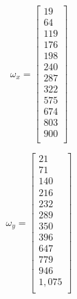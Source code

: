\documentclass[11pt,a4paper,titlepage]{report}
\begin{document}
\begin{minipage}{0.45\linewidth}
\begin{small}
\begin{equation}
    \omega_x=
    \left[
    \begin{matrix}
    19\\
    64\\
    119\\
    176\\
    198\\
    240\\
    287\\
    322\\
    575\\
    674\\
    803\\
    900\\
    \end{matrix}
    \right]
    \label{eq:I.1 - omega x}
\end{equation}
\end{small}
\end{minipage}
\begin{minipage}{0.45\linewidth}
\begin{small}
\begin{equation}
    \omega_y=
    \left[
    \begin{matrix}
    21\\
    71\\
    140\\
    216\\
    232\\
    289\\
    350\\
    396\\
    647\\
    779\\
    946\\
    1,075\\
    \end{matrix}
    \right]
    \label{eq:I.1 - omega y}
\end{equation}
\end{small}
\end{minipage}
\end{document}

